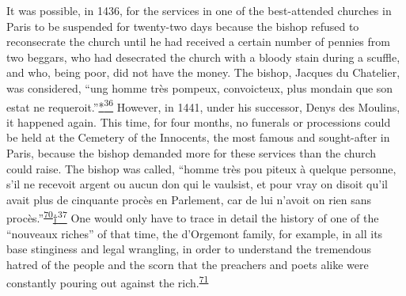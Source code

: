It was possible, in 1436, for the services in one of the best-attended
churches in Paris to be suspended for twenty-two days because the bishop
refused to reconsecrate the church until he had received a certain
number of pennies from two beggars, who had desecrated the church with a
bloody stain during a scuffle, and who, being poor, did not have the
money. The bishop, Jacques du Chatelier, was considered, ``ung homme
très pompeux, convoicteux, plus mondain que son estat ne
requeroit.''\protect\hypertarget{08_Chapter_One__THE_PASSIONATE_INTE.xhtmlux5cux23id_2405}{\protect\hyperlink{23_NOTES.xhtmlux5cux23id_2406}{*\textsuperscript{36}}}
However, in 1441, under his successor, Denys des Moulins, it happened
again. This time, for four months, no funerals or processions could be
held at the Cemetery of the Innocents, the most famous and sought-after
in Paris, because the bishop demanded more for these services than the
church could raise. The bishop was called, ``homme très pou piteux à
quelque personne, s'il ne recevoit argent ou aucun don qui le vaulsist,
et pour vray on disoit qu'il avait plus de cinquante procès en
Parlement, car de lui n'avoit on rien sans
procès.''\textsuperscript{\protect\hypertarget{08_Chapter_One__THE_PASSIONATE_INTE.xhtmlux5cux23id_2092}{\protect\hyperlink{23_NOTES.xhtmlux5cux23id_2093}{70}}}\protect\hypertarget{08_Chapter_One__THE_PASSIONATE_INTE.xhtmlux5cux23id_2407}{\protect\hyperlink{23_NOTES.xhtmlux5cux23id_2408}{†\textsuperscript{37}}}
One would only have to trace in detail the history of one of the
``nouveaux riches'' of that time, the d'Orgemont family, for example, in
all its base stinginess and legal wrangling, in order to understand the
tremendous hatred of the people and the scorn that the preachers and
poets alike were constantly pouring out against the
rich.\textsuperscript{\protect\hypertarget{08_Chapter_One__THE_PASSIONATE_INTE.xhtmlux5cux23id_2090}{\protect\hyperlink{23_NOTES.xhtmlux5cux23id_2091}{71}}}


